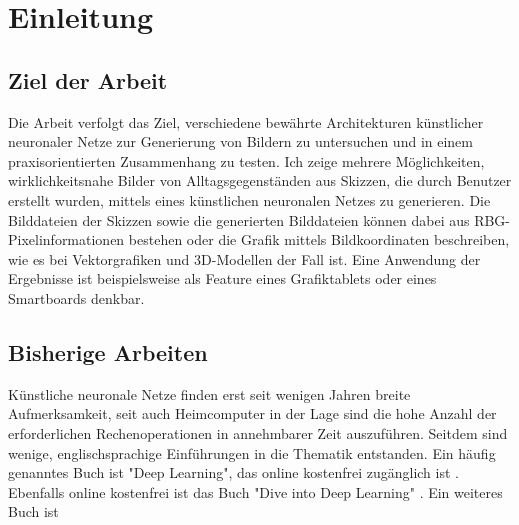 \chapter{Einleitung}
\label{ch:einleitung}

\section{Ziel der Arbeit}
\label{sec:ziel}
Die Arbeit verfolgt das Ziel, verschiedene bewährte Architekturen künstlicher
neuronaler Netze zur Generierung von Bildern zu untersuchen und in einem
praxisorientierten Zusammenhang zu testen. Ich zeige mehrere Möglichkeiten,
wirklichkeitsnahe Bilder von Alltagsgegenständen aus Skizzen, die durch Benutzer
erstellt wurden, mittels eines künstlichen neuronalen Netzes zu generieren. Die
Bilddateien der Skizzen sowie die generierten Bilddateien können dabei aus
RBG-Pixelinformationen bestehen oder die Grafik mittels Bildkoordinaten beschreiben,
wie es bei Vektorgrafiken und 3D-Modellen der Fall ist. Eine Anwendung der
Ergebnisse ist beispielsweise als Feature eines Grafiktablets oder eines
Smartboards denkbar.

\section{Bisherige Arbeiten}
\label{sec:related}
Künstliche neuronale Netze finden erst seit wenigen Jahren breite Aufmerksamkeit,
seit auch Heimcomputer in der Lage sind die hohe Anzahl der erforderlichen
Rechenoperationen in annehmbarer Zeit auszuführen. Seitdem sind wenige,
englischsprachige Einführungen in die Thematik entstanden. Ein häufig genanntes
Buch ist "Deep Learning", das online kostenfrei zugänglich ist \cite{Goodfellow-et-al-2016}.
Ebenfalls online kostenfrei ist das Buch "Dive into Deep Learning" \cite{zhang2020dive}.
Ein weiteres Buch ist
